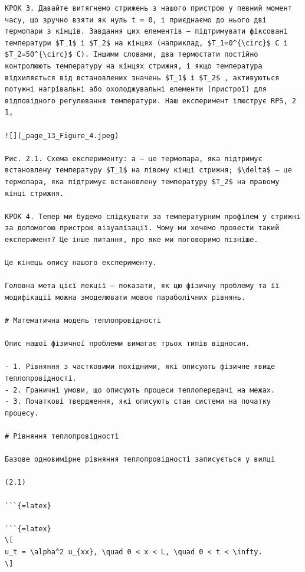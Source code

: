 \documentclass[
  ukrainian,
]{article}
\begin{document}
\begin{verbatim}
КРОК 3. Давайте витягнемо стрижень з нашого пристрою у певний момент часу, що зручно взяти як нуль t = 0, і приєднаємо до нього дві термопари з кінців. Завдання цих елементів — підтримувати фіксовані температури $T_1$ і $T_2$ на кінцях (наприклад, $T_1=0^{\circ}$ C і $T_2=50^{\circ}$ C). Іншими словами, два термостати постійно контролюють температуру на кінцях стрижня, і якщо температура відхиляється від встановлених значень $T_1$ і $T_2$ , активуються потужні нагрівальні або охолоджувальні елементи (пристрої) для відповідного регулювання температури. Наш експеримент ілюструє RPS, 2 1,

![](_page_13_Figure_4.jpeg)

Рис. 2.1. Схема експерименту: a — це термопара, яка підтримує встановлену температуру $T_1$ на лівому кінці стрижня; $\delta$ — це термопара, яка підтримує встановлену температуру $T_2$ на правому кінці стрижня.

КРОК 4. Тепер ми будемо слідкувати за температурним профілем у стрижні за допомогою пристрою візуалізації. Чому ми хочемо провести такий експеримент? Це інше питання, про яке ми поговоримо пізніше.

Це кінець опису нашого експерименту.

Головна мета цієї лекції — показати, як цю фізичну проблему та її модифікації можна змоделювати мовою параболічних рівнянь.

# Математична модель теплопровідності

Опис нашої фізичної проблеми вимагає трьох типів відносин.

- 1. Рівняння з частковими похідними, які описують фізичне явище теплопровідності.
- 2. Граничні умови, що описують процеси теплопередачі на межах.
- 3. Початкові твердження, які описують стан системи на початку процесу.

# Рівняння теплопровідності

Базове одновимірне рівняння теплопровідності записується у вилці

(2.1)

```{=latex}

```{=latex}
\[
u_t = \alpha^2 u_{xx}, \quad 0 < x < L, \quad 0 < t < \infty.
\]
\end{verbatim}
\end{document}
